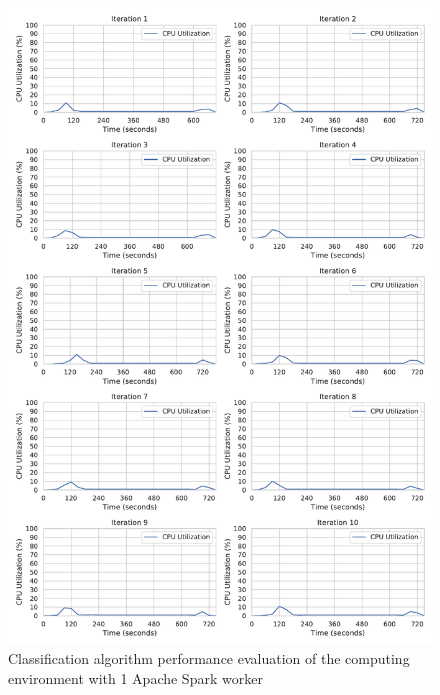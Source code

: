 \begin{figure}[h]
\centering
\includegraphics[scale=0.4]{images/07_evaluation/taxi/taxi_1_worker_cpu_performance}
\caption{Classification algorithm performance evaluation of the computing environment with 1 Apache Spark worker}
\label{fig:07_mortgage_static-cpu_results}
\end{figure}

